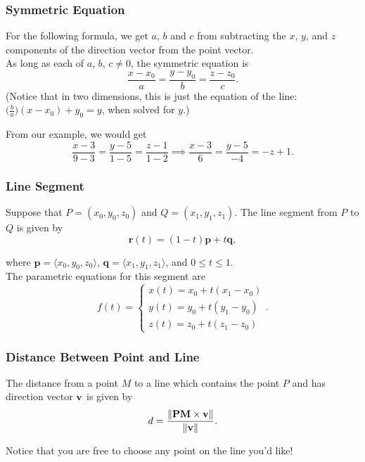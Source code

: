 \subsubsection{Symmetric Equation}

For the following formula, we get \(a\), \(b\) and \(c\) from subtracting the \(x\), \(y\), and \(z\) components of the direction vector from the point vector. \\

As long as each of \(a\), \(b\), \(c \neq 0\), the symmetric equation is
\[
    \frac{x - x_{0}}{a} = \frac{y - y_{0}}{b} = \frac{z - z_{0}}{c}.
\]
(Notice that in two dimensions, this is just the equation of the line: \(\bigl(\frac{b}{a}\bigr)(x - x_{0}) + y_{0} = y\), when solved for \(y\).)

From our example, we would get
\[
\frac{x - 3}{9 - 3} = \frac{y - 5}{1 - 5} = \frac{z - 1}{1 - 2} \implies \frac{x - 3}{6} = \frac{y - 5}{-4} = -z + 1.
\]

\subsubsection{Line Segment}

Suppose that \(P = (x_{0},y_{0},z_{0})\) and \(Q = (x_{1},y_{1},z_{1})\). The line segment from \(P\) to \(Q\) is given by
\[
    \mathbf{r}(t) = (1 - t)\mathbf{p} + t\mathbf{q},
\]

where \(\mathbf{p} = \langle x_{0},y_{0},z_{0} \rangle\), \(\mathbf{q} = \langle x_{1},y_{1},z_{1} \rangle\), and \(0 \leq t \leq 1\). \\

The parametric equations for this segment are 
\[
    f(t) = \begin{cases}
        x(t) = x_{0} + t(x_{1} - x_{0}) \\
        y(t) = y_{0} + t(y_{1} - y_{0}) \\
        z(t) = z_{0} + t(z_{1} - z_{0})
    \end{cases}.
\]

\subsubsection{Distance Between Point and Line}

The distance from a point \(M\) to a line which contains the point \(P\) and has direction vector \(\mathbf{v}\) is given by
\[
    d = \frac{\|\mathbf{PM} \times \mathbf{v}\|}{\left\lVert \mathbf{v}\right\rVert}.
\]

Notice that you are free to choose any point on the line you'd like!

